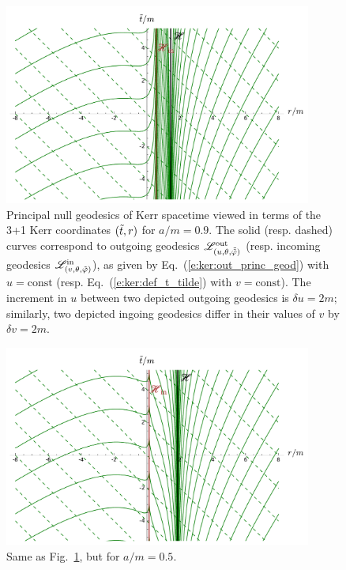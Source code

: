 \begin{figure}
\centerline{\includegraphics[width=0.9\textwidth]{ker_princ_null_geod_a90.pdf}}
\caption[]{\label{f:ker:princ_null_geod_a90} \footnotesize
Principal null geodesics of Kerr spacetime viewed in terms of the 3+1 Kerr
coordinates $({\tilde t},r)$ for $a/m=0.9$. The solid (resp. dashed) curves
correspond to outgoing geodesics $\mathscr{L}^{\rm out}_{(u,\theta,\tilde{{\tilde\varphi}})}$
(resp. incoming geodesics $\mathscr{L}^{\rm in}_{(v,\theta,{\tilde\varphi})}$), as given by
Eq.~(\ref{e:ker:out_princ_geod}) with $u=\mathrm{const}$
(resp. Eq.~(\ref{e:ker:def_t_tilde}) with $v=\mathrm{const}$). The increment
in $u$ between two depicted outgoing geodesics is $\delta u = 2m$;
similarly, two depicted ingoing geodesics differ in their values of
$v$ by $\delta v = 2m$.
}
\end{figure}

\begin{figure}
\centerline{\includegraphics[width=0.9\textwidth]{ker_princ_null_geod_a50.pdf}}
\caption[]{\label{f:ker:princ_null_geod_a50} \footnotesize
Same as Fig.~\ref{f:ker:princ_null_geod_a90}, but for $a/m=0.5$.}
\end{figure}


